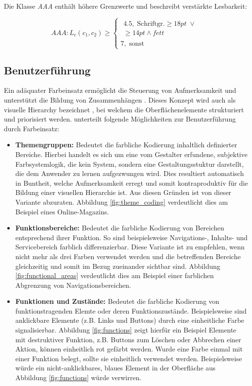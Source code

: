 \documentclass[11pt,a4paper,bibliography=totoc,twocolumn]{scrartcl}
\begin{document}
Die Klasse \emph{AAA} enthält höhere Grenzwerte und beschreibt verstärkte Lesbarkeit:

\begin{equation}
  	AAA: L_c(c_1, c_2) \geq
	\begin{cases}
		\begin{split}4.5, \; \text{Schriftgr.} \geq 18pt \; \lor \\ \geq 14pt \land fett\end{split} \\
		7,  \;  \text{sonst}
	\end{cases}
\end{equation}

\subsection{Benutzerführung}
\label{sec:usability}
Ein adäquater Farbeinsatz ermöglicht die Steuerung von Aufmerksamkeit und unterstützt die Bildung von Zusammenhängen \citep{webdesign}.  Dieses Konzept wird auch als visuelle Hierarchy bezeichnet \citep{visual-hierarchy}, bei welchem die Oberflächenelemente strukturiert und priorisiert werden.
\citet{webdesign} unterteilt folgende Möglichkeiten zur Benutzerführung durch Farbeinsatz:

\begin{itemize}
	\item \textbf{Themengruppen:} Bedeutet die farbliche Kodierung inhaltlich definierter Bereiche. Hierbei handelt es sich um eine vom Gestalter erfundene, subjektive Farbsystemlogik, die kein System, sondern eine Gestaltungsstuktur darstellt, die dem Anwender zu lernen aufgezwungen wird. Dies resultiert automatisch in Buntheit, welche Aufmerksamkeit erregt und somit kontraproduktiv für die Bildung einer visuellen Hierarchie ist. Aus diesen Gründen ist von dieser Variante abzuraten. Abbildung \ref{fig:theme_coding} verdeutlicht dies am Beispiel eines Online-Magazins.
	\item \textbf{Funktionsbereiche:} Bedeutet die farbliche Kodierung von Bereichen entsprechend ihrer Funktion. So sind beispielsweise Navigations-, Inhalts- und Servicebereich farblich differenzierbar. Diese Variante ist zu empfehlen, wenn nicht mehr als drei Farben verwendet werden und die betreffenden Bereiche gleichzeitig und somit im Bezug zueinander sichtbar sind. Abbildung \ref{fig:functional_areas} verdeutlicht dies am Beispiel einer farblichen Abgrenzung von Navigationsbereichen.
	\item \textbf{Funktionen und Zustände:} Bedeutet die farbliche Kodierung von funktionstragenden Elemte oder deren Funktionszustände. Beispielsweise sind anklickbare Elemente (z.B. Links und Buttons) durch eine einheitliche Farbe signalisierbar. Abbildung \ref{fig:functions} zeigt hierfür ein Beispiel Elemente mit destruktiver Funktion, z.B. Buttons zum Löschen oder Abbrechen einer Aktion, können einheitlich rot gefärbt werden. Wurde eine Farbe einmal mit einer Funktion belegt, sollte sie einheitlich verwendet werden. Beispielsweise würde ein nicht-anklickbares, blaues Element in der Oberfläche aus Abbildung \ref{fig:functions} würde verwirren.
\end{itemize}
\end{document}
